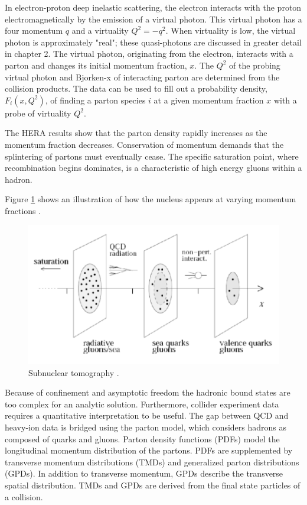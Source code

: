 In electron-proton deep inelastic scattering, the electron interacts with the proton electromagnetically by the emission of a virtual photon. This virtual photon has a four momentum $q$ and a virtuality $Q^2 = - q^2$. When virtuality is low, the virtual photon is approximately "real"; these quasi-photons are discussed in greater detail in chapter 2. The virtual photon, originating from the electron, interacts with a parton and changes its initial momentum fraction, $x$. The $Q^2$ of the probing virtual photon and Bjorken-x of interacting parton are determined from the collision products. The data can be used to fill out a probability density, $F_i(x, Q^2)$, of finding a parton species $i$ at a given momentum fraction $x$ with a probe of virtuality $Q^2$.

The HERA results show that the parton density rapidly increases as the momentum fraction decreases. Conservation of momentum demands that the splintering of partons must eventually cease. The specific saturation point, where recombination begins dominates, is a characteristic of high energy gluons within a hadron.

Figure \ref{fig:nuclImag} shows an illustration of how the nucleus appears at varying momentum fractions \cite{Accardi:2011mz}.

\begin{figure}[h!]
\begin{centering}
\includegraphics[width=7in]{Chapter1/importfigs/imaging_the_nucleon_upc_dijets_pres.png}
\par\end{centering}
\caption{Subnuclear tomography \cite{Accardi:2011mz}. \label{fig:nuclImag}}
\end{figure}

Because of confinement and asymptotic freedom the hadronic bound states are too complex for an analytic solution. Furthermore, collider experiment data requires a quantitative interpretation to be useful. The gap between QCD and heavy-ion data is bridged using the parton model, which considers hadrons as composed of quarks and gluons. Parton density functions (PDFs) model the longitudinal momentum distribution of the partons. PDFs are supplemented by transverse momentum distributions (TMDs) and generalized parton distributions (GPDs). In addition to transverse momentum, GPDs describe the transverse spatial distribution. TMDs and GPDs are derived from the final state particles of a collision.

